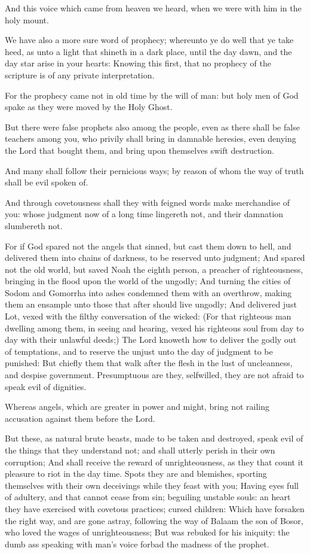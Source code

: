 \Verse And this voice which came from heaven we heard, when we were with him in the holy mount.

\Verse We have also a more sure word of prophecy; whereunto ye do well that ye take heed, as unto a light that shineth in a dark place, until the day dawn, and the day star arise in your hearts: \Verse Knowing this first, that no prophecy of the scripture is of any private interpretation.

\Verse For the prophecy came not in old time by the will of man: but holy men of God spake as they were moved by the Holy Ghost.


\Chapter
\Verse But there were false prophets also among the people, even as there shall be false teachers among you, who privily shall bring in damnable heresies, even denying the Lord that bought them, and bring upon themselves swift destruction.

\Verse And many shall follow their pernicious ways; by reason of whom the way of truth shall be evil spoken of.

\Verse And through covetousness shall they with feigned words make merchandise of you: whose judgment now of a long time lingereth not, and their damnation slumbereth not.

\Verse For if God spared not the angels that sinned, but cast them down to hell, and delivered them into chains of darkness, to be reserved unto judgment; \Verse And spared not the old world, but saved Noah the eighth person, a preacher of righteousness, bringing in the flood upon the world of the ungodly; \Verse And turning the cities of Sodom and Gomorrha into ashes condemned them with an overthrow, making them an ensample unto those that after should live ungodly; \Verse And delivered just Lot, vexed with the filthy conversation of the wicked: \Verse (For that righteous man dwelling among them, in seeing and hearing, vexed his righteous soul from day to day with their unlawful deeds;) \Verse The Lord knoweth how to deliver the godly out of temptations, and to reserve the unjust unto the day of judgment to be punished: \Verse But chiefly them that walk after the flesh in the lust of uncleanness, and despise government. Presumptuous are they, selfwilled, they are not afraid to speak evil of dignities.

\Verse Whereas angels, which are greater in power and might, bring not railing accusation against them before the Lord.

\Verse But these, as natural brute beasts, made to be taken and destroyed, speak evil of the things that they understand not; and shall utterly perish in their own corruption; \Verse And shall receive the reward of unrighteousness, as they that count it pleasure to riot in the day time. Spots they are and blemishes, sporting themselves with their own deceivings while they feast with you; \Verse Having eyes full of adultery, and that cannot cease from sin; beguiling unstable souls: an heart they have exercised with covetous practices; cursed children: \Verse Which have forsaken the right way, and are gone astray, following the way of Balaam the son of Bosor, who loved the wages of unrighteousness; \Verse But was rebuked for his iniquity: the dumb ass speaking with man's voice forbad the madness of the prophet.

